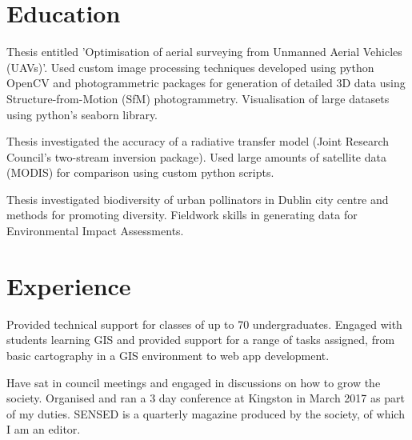 \documentclass[]{deedy-resume-openfont}
\begin{document}
\hfill
\begin{minipage}[t]{0.66\textwidth}


\section{Education}\label{sec:education}

Thesis entitled 'Optimisation of aerial surveying from Unmanned Aerial Vehicles (UAVs)'.
Used custom image processing techniques developed using python OpenCV and photogrammetric packages for generation of detailed 3D data using Structure-from-Motion (SfM) photogrammetry.
Visualisation of large datasets using python's seaborn library.
\sectionsep

Thesis investigated the accuracy of a radiative transfer model (Joint Research Council's two-stream inversion package).
Used large amounts of satellite data (MODIS) for comparison using custom python scripts.
\sectionsep

Thesis investigated biodiversity of urban pollinators in Dublin city centre and methods for promoting diversity.
Fieldwork skills in generating data for Environmental Impact Assessments.
\sectionsep


\section{Experience}\label{sec:experience}

Provided technical support for classes of up to 70 undergraduates.
Engaged with students learning GIS and provided support
for a range of tasks assigned, from basic cartography in a GIS environment to web app development.
\sectionsep

\linebreak
{}
Have sat in council meetings and engaged in discussions on how to grow the society.
Organised and ran a 3 day conference at Kingston in March 2017 as part of my duties.
SENSED is a quarterly magazine produced by the society, of which I am an editor.
\sectionsep


\end{minipage}
\end{document}
